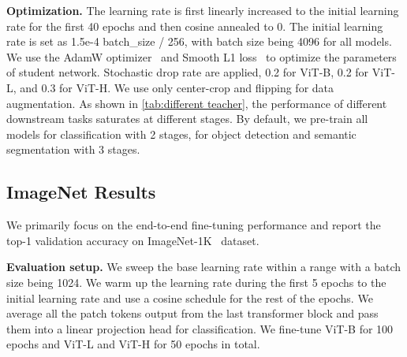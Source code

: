 \documentclass[10pt,twocolumn,letterpaper]{article}
\renewcommand{\paragraph}[1]{\vspace{1.25mm}\noindent\textbf{#1}}
\begin{document}
\paragraph{Optimization.} The learning rate is first linearly increased to the initial learning rate for the first 40 epochs and then cosine annealed to 0. The initial learning rate is set as 1.5e-4  batch\_size / 256, with batch size being 4096 for all models. We use the AdamW optimizer~\cite{adamw} and Smooth L1 loss~\cite{fast-rcnn} to optimize the parameters of student network. 
Stochastic drop rate are applied, 0.2 for ViT-B, 0.2 for ViT-L, and 0.3 for ViT-H. 
We use only center-crop and flipping for data augmentation.
As shown in \cref{tab:different teacher}, the performance of different downstream tasks saturates at different stages. 
By default, we pre-train all models for classification with 2 stages, for object detection and semantic segmentation with 3 stages. 


\subsection{ImageNet Results}
\label{sec:exp-ImageNet}

We primarily focus on the end-to-end fine-tuning performance and report the top-1 validation accuracy on ImageNet-1K~\cite{imagenet} dataset.

\paragraph{Evaluation setup.}
We sweep the base learning rate within a range with a batch size being 1024. 
We warm up the learning rate during the first 5 epochs to the initial learning rate and use a cosine schedule for the rest of the epochs.
We average all the patch tokens output from the last transformer block and pass them into a linear projection head for classification.
We fine-tune ViT-B for 100 epochs and ViT-L and ViT-H for 50 epochs in total.
\end{document}
